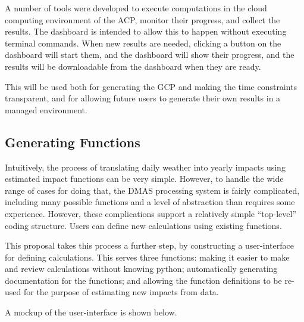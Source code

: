 \documentclass[12pt, oneside]{amsart}
\begin{document}
A number of tools were developed to execute computations in the cloud
computing environment of the ACP, monitor their progress, and collect
the results.  The dashboard is intended to allow this to happen
without executing terminal commands.  When new results are needed,
clicking a button on the dashboard will start them, and the dashboard
will show their progress, and the results will be downloadable from
the dashboard when they are ready.

This will be used both for generating the GCP and making the time
constraints transparent, and for allowing future users to generate
their own results in a managed environment.

\subsection{Generating Functions}
\label{sec:functiongen}

Intuitively, the process of translating daily weather into yearly impacts using estimated impact functions can be very simple.  However, to handle the wide range of cases for doing that, the DMAS processing system is fairly complicated, including many possible functions and a level of abstraction than requires some experience.  However, these complications support a relatively simple ``top-level'' coding structure.  Users can define new calculations using existing functions.

This proposal takes this process a further step, by constructing a user-interface for defining calculations.  This serves three functions: making it easier to make and review calculations without knowing python; automatically generating documentation for the functions; and allowing the function definitions to be re-used for the purpose of estimating new impacts from data.

A mockup of the user-interface is shown below.
\end{document}
